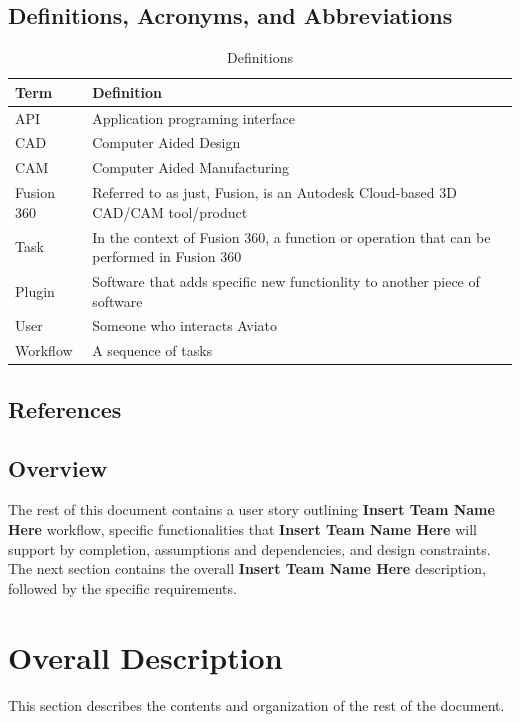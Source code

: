 \documentclass[onecolumn, draftclsnofoot,10pt, compsoc]{IEEEtran}
\def \CapstoneTeamName{\textbf{Insert Team Name Here} }
\def \botname{Aviato }
\begin{document}
    \subsection{Definitions, Acronyms, and Abbreviations}
        \begin{table}[h]
            \centering
            \caption{Definitions}
            \label{my-label}
            \begin{tabular}{|l|l|}
                \hline
                \textbf{Term} & \textbf{Definition} \\ \hline
                API & Application programing interface \\ \hline
                CAD & Computer Aided Design \\ \hline
                CAM & Computer Aided Manufacturing \\ \hline
                Fusion 360 & 
                Referred to as just, Fusion, is an Autodesk Cloud-based 3D CAD/CAM tool/product \\ \hline
                Task & In the context of Fusion 360, a function or operation that can be performed in Fusion 360 \\ \hline
                Plugin & Software that adds specific new functionlity to another piece of software \\ \hline
                User & Someone who interacts \botname  \\ \hline
                Workflow & A sequence of tasks \\ \hline
            \end{tabular}
        \end{table}
    \subsection{References}
    \subsection{Overview}
        The rest of this document contains a user story outlining \CapstoneTeamName workflow, specific functionalities that \CapstoneTeamName will support by completion, assumptions and dependencies, and design constraints. 
        The next section contains the overall \CapstoneTeamName description, followed by the specific requirements. 

\section{Overall Description}
    This section describes the contents and organization of the rest of the document. 
\end{document}
